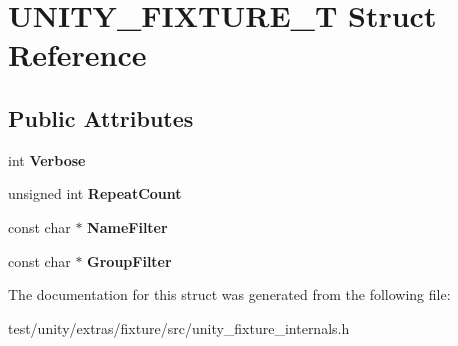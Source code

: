 \hypertarget{structUNITY__FIXTURE__T}{}\section{U\+N\+I\+T\+Y\+\_\+\+F\+I\+X\+T\+U\+R\+E\+\_\+T Struct Reference}
\label{structUNITY__FIXTURE__T}
\subsection*{Public Attributes}
\begin{DoxyCompactItemize}
\item 
\mbox{\label{structUNITY__FIXTURE__T_ae5650e8bb94e0d9c75913a112277e445}} 
int {\bfseries Verbose}
\item 
\mbox{\label{structUNITY__FIXTURE__T_aaa9feba9c4991248a4107098e40813ac}} 
unsigned int {\bfseries Repeat\+Count}
\item 
\mbox{\label{structUNITY__FIXTURE__T_a98e6483802e9ba8c55cd10f9eec36cb3}} 
const char $\ast$ {\bfseries Name\+Filter}
\item 
\mbox{\label{structUNITY__FIXTURE__T_a9480a05bc2d571c0fe5f8a7872082af1}} 
const char $\ast$ {\bfseries Group\+Filter}
\end{DoxyCompactItemize}


The documentation for this struct was generated from the following file\+:\begin{DoxyCompactItemize}
\item 
test/unity/extras/fixture/src/unity\+\_\+fixture\+\_\+internals.\+h\end{DoxyCompactItemize}
